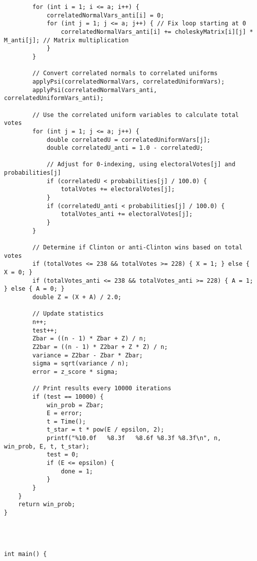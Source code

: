 \documentclass{report}
\begin{document}
\begin{lstlisting}
        for (int i = 1; i <= a; i++) {
            correlatedNormalVars_anti[i] = 0;
            for (int j = 1; j <= a; j++) { // Fix loop starting at 0
                correlatedNormalVars_anti[i] += choleskyMatrix[i][j] * M_anti[j]; // Matrix multiplication
            }
        }

        // Convert correlated normals to correlated uniforms
        applyPsi(correlatedNormalVars, correlatedUniformVars);
        applyPsi(correlatedNormalVars_anti, correlatedUniformVars_anti);

        // Use the correlated uniform variables to calculate total votes
        for (int j = 1; j <= a; j++) {
            double correlatedU = correlatedUniformVars[j];
            double correlatedU_anti = 1.0 - correlatedU;

            // Adjust for 0-indexing, using electoralVotes[j] and probabilities[j]
            if (correlatedU < probabilities[j] / 100.0) {
                totalVotes += electoralVotes[j];
            }
            if (correlatedU_anti < probabilities[j] / 100.0) {
                totalVotes_anti += electoralVotes[j];
            }
        }

        // Determine if Clinton or anti-Clinton wins based on total votes
        if (totalVotes <= 238 && totalVotes >= 228) { X = 1; } else { X = 0; }
        if (totalVotes_anti <= 238 && totalVotes_anti >= 228) { A = 1; } else { A = 0; }
        double Z = (X + A) / 2.0;

        // Update statistics
        n++;
        test++;
        Zbar = ((n - 1) * Zbar + Z) / n;
        Z2bar = ((n - 1) * Z2bar + Z * Z) / n;
        variance = Z2bar - Zbar * Zbar;
        sigma = sqrt(variance / n);
        error = z_score * sigma;

        // Print results every 10000 iterations
        if (test == 10000) {
            win_prob = Zbar;
            E = error;
            t = Time();
            t_star = t * pow(E / epsilon, 2);
            printf("%10.0f   %8.3f   %8.6f %8.3f %8.3f\n", n, win_prob, E, t, t_star);
            test = 0;
            if (E <= epsilon) {
                done = 1;
            }
        }
    }
    return win_prob;
}




int main() {


\end{lstlisting}
\end{document}
